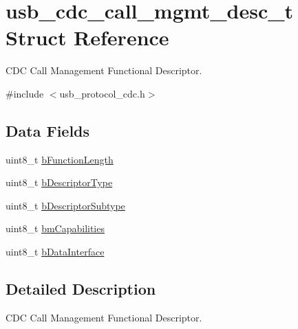 \hypertarget{structusb__cdc__call__mgmt__desc__t}{
\section{usb\-\_\-cdc\-\_\-call\-\_\-mgmt\-\_\-desc\-\_\-t \-Struct \-Reference}
\label{structusb__cdc__call__mgmt__desc__t}
}


\-C\-D\-C \-Call \-Management \-Functional \-Descriptor.  




{\ttfamily \#include $<$usb\-\_\-protocol\-\_\-cdc.\-h$>$}

\subsection*{\-Data \-Fields}
\begin{DoxyCompactItemize}
\item 
uint8\-\_\-t \hyperlink{structusb__cdc__call__mgmt__desc__t_aafa3f523e8bc96b0cd539637d03aaf6b}{b\-Function\-Length}
\item 
uint8\-\_\-t \hyperlink{structusb__cdc__call__mgmt__desc__t_a80069fa1e8a1c090b4906e4901a9c0d0}{b\-Descriptor\-Type}
\item 
uint8\-\_\-t \hyperlink{structusb__cdc__call__mgmt__desc__t_aebf8887aeb7e00878112efe9ac6b14e2}{b\-Descriptor\-Subtype}
\item 
uint8\-\_\-t \hyperlink{structusb__cdc__call__mgmt__desc__t_ae6648388cc0a5e305a3e87ab62f9e24f}{bm\-Capabilities}
\item 
uint8\-\_\-t \hyperlink{structusb__cdc__call__mgmt__desc__t_acb0a5cca915a2af2291864d772c9807a}{b\-Data\-Interface}
\end{DoxyCompactItemize}


\subsection{\-Detailed \-Description}
\-C\-D\-C \-Call \-Management \-Functional \-Descriptor. 

